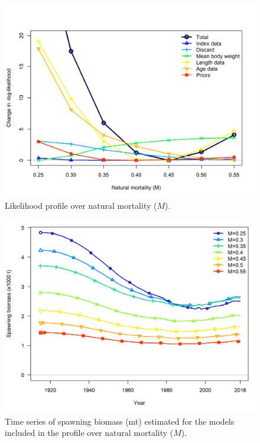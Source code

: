 \documentclass[12pt,]{article}
\begin{document}
\FloatBarrier

\begin{figure}
\centering
\includegraphics{Figures/profile_M.png}
\caption{Likelihood profile over natural mortality (\(M\)).
\label{fig:profile_M}}
\end{figure}

\begin{figure}
\centering
\includegraphics{Figures/profile_M_compare1_spawnbio.png}
\caption{Time series of spawning biomass (mt) estimated for the models
included in the profile over natural mortality (\(M\)).
\label{fig:profile_M_compare1_spawnbio}}
\end{figure}
\end{document}
